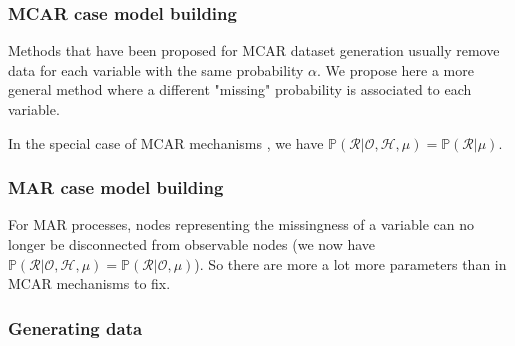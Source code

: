 \subsubsection{MCAR case model building}

Methods that have been proposed for MCAR dataset generation usually remove data for each variable with the same probability $\alpha$. We propose here a more general method where a different "missing" probability is associated to each variable.

\noindent In the special case of MCAR mechanisms \cite{Rub76}, we have $\mathbb{P}(\mathcal{R}|\mathcal{O},\mathcal{H},\mu)=\mathbb{P}(\mathcal{R}|\mu)$.
\vspace*{-\baselineskip}


\subsubsection{MAR case model building}

For MAR processes, nodes representing the missingness of a variable
can no longer be disconnected from observable nodes (we now have
 $\mathbb{P}(\mathcal{R}|\mathcal{O},\mathcal{H},\mu)=\mathbb{P}(\mathcal{R}|\mathcal{O},\mu)$).
So there are more a lot more parameters than in MCAR mechanisms to fix.
\vspace*{-\baselineskip}


\subsubsection{Generating data}
\vspace*{-\baselineskip}

